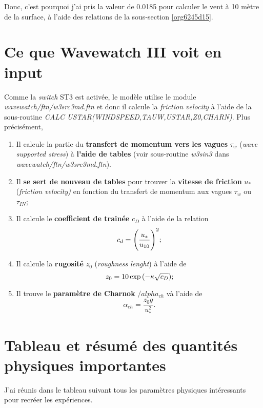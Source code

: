 \documentclass[10pt]{report}
\numberwithin{equation}{section}
\newcommand{\venti}{\vphantom{\sum_x^x}}
\begin{document}
Donc, c'est pourquoi j'ai pris la valeur de 0.0185 pour calculer le vent à 10 mètre de la surface, à l'aide des relations de la sous-section \ref{org6245d15}.

\section{Ce que Wavewatch III voit en input}
\label{sec:org2cb6d71}

Comme la \emph{switch} ST3 est activée, le modèle utilise le module \emph{wavewatch/ftn/w3src3md.ftn} et donc il calcule la \emph{friction velocity} à l'aide de la sous-routine \emph{CALC USTAR(WINDSPEED,TAUW,USTAR,Z0,CHARN)}.
Plus précisément,
\begin{enumerate}
\item Il calcule la partie du \textbf{transfert de momentum vers les vagues} \(\tau_w\) (\emph{wave supported stress}) à \textbf{l'aide de tables} (voir sous-routine \emph{w3sin3} dans \emph{wavewatch/ftn/w3src3md.ftn}).
\item Il \textbf{se sert de nouveau de tables} pour trouver la \textbf{vitesse de friction} \(u_*\) (\emph{friction velocity)} en fonction du transfert de momentum aux vagues \(\tau_w\) ou \(\tau_{IN}\);
\item Il calcule le \textbf{coefficient de trainée} \(c_D\) à l'aide de la relation
\begin{equation}
   c_d = \qty(\venti\frac{u_*}{u_{10}})^2;
\end{equation}
\item Il calcule la \textbf{rugosité} \(z_0\) (\emph{roughness lenght}) à l'aide de
\begin{equation}
   z_0 = 10 \exp \qty(-\kappa \sqrt{c_D});
\end{equation}
\item Il trouve le \textbf{paramètre de Charnok} \(/alpha_{ch}\) và l'aide de 
\begin{equation}
   \alpha_{ch} = \frac{z_0 g}{u_*^2}.
\end{equation}
\end{enumerate}



\section{Tableau et résumé des quantités physiques importantes}
\label{sec:orgb374df2}

J'ai réunis dans le tableau suivant tous les paramètres physiques intéressants pour recréer les expériences.
\end{document}
